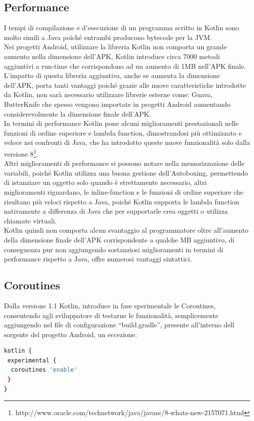 \subsection{Performance}
I tempi di compilazione e d'esecuzione di un programma scritto in Kotlin sono molto simili a Java poiché entrambi producono bytecode per la JVM.\\
Nei progetti Android, utilizzare la libreria Kotlin non comporta un grande aumento nella dimensione dell'APK, Kotlin introduce circa 7000 metodi aggiuntivi a run-time che corrispondono ad un aumento di 1MB nell'APK finale.\\
L'impatto di questa libreria aggiuntiva, anche se aumenta la dimensione dell'APK, porta tanti vantaggi poiché grazie alle nuove caratteristiche introdotte da Kotlin, non sarà necessario utilizzare librerie esterne come: Guava, ButterKnife che spesso vengono importate in progetti Android aumentando considerevolmente la dimensione finale dell'APK.\\
In termini di performance Kotlin pone alcuni miglioramenti prestazionali nelle funzioni di ordine superiore e lambda function, dimostrandosi più ottimizzato e veloce nei confronti di Java, che ha introdotto queste nuove funzionalità solo dalla versione 8\footnote{http://www.oracle.com/technetwork/java/javase/8-whats-new-2157071.html}.\\
Altri miglioramenti di performance si possono notare nella memorizzazione delle variabili, poiché Kotlin utilizza una buona gestione dell'Autoboxing, permettendo di istanziare un oggetto solo quando è strettamente necessario, altri miglioramenti riguardano, le inline-function e le funzioni di ordine superiore che risultano più veloci rispetto a Java, poiché Kotlin supporta le lambda function nativamente a differenza di Java che per supportarle crea oggetti o utilizza chiamate virtuali.\\
Kotlin quindi non comporta alcun svantaggio al programmatore oltre all'aumento della dimensione finale dell'APK corrispondente a qualche MB aggiuntivo, di conseguenza pur non aggiungendo sostanziosi miglioramenti in termini di performance rispetto a Java, offre numerosi vantaggi sintattici.

\newpage




\subsection{Coroutines}
Dalla versione 1.1 Kotlin, introduce in fase sperimentale le Coroutines, consentendo agli sviluppatore di testarne le funzionalità, semplicemente aggiungendo nel file di configurazione ``build.gradle'', presente all'interno dell sorgente del progetto Android, un eccezione:
\begin{lstlisting}[language=bash,caption={Gradle Coroutines }]
kotlin {
 experimental {
  coroutines 'enable'
 }
}
\end{lstlisting}


